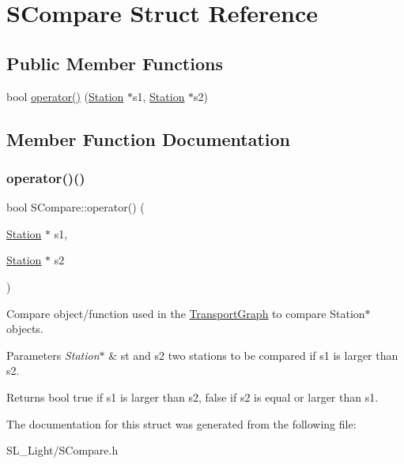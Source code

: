 \hypertarget{struct_s_compare}{}\section{S\+Compare Struct Reference}
\label{struct_s_compare}
\subsection*{Public Member Functions}
\begin{DoxyCompactItemize}
\item 
bool \mbox{\hyperlink{struct_s_compare_aea0a46a28a5c307456cc4c128a0e675a}{operator()}} (\mbox{\hyperlink{class_station}{Station}} $\ast$s1, \mbox{\hyperlink{class_station}{Station}} $\ast$s2)
\end{DoxyCompactItemize}


\subsection{Member Function Documentation}
\mbox{\label{struct_s_compare_aea0a46a28a5c307456cc4c128a0e675a}} 
\subsubsection{\texorpdfstring{operator()()}{operator()()}}
{\footnotesize\ttfamily bool S\+Compare\+::operator() (\begin{DoxyParamCaption}\item[{\mbox{\hyperlink{class_station}{Station}} $\ast$}]{s1,  }\item[{\mbox{\hyperlink{class_station}{Station}} $\ast$}]{s2 }\end{DoxyParamCaption})\hspace{0.3cm}{\ttfamily [inline]}}

Compare object/function used in the \mbox{\hyperlink{class_transport_graph}{Transport\+Graph}} to compare Station$\ast$ objects.


\begin{DoxyParams}{Parameters}
{\em Station$\ast$} & st and s2 two stations to be compared if s1 is larger than s2.\\
\hline
\end{DoxyParams}
\begin{DoxyReturn}{Returns}
bool true if s1 is larger than s2, false if s2 is equal or larger than s1. 
\end{DoxyReturn}


The documentation for this struct was generated from the following file\+:\begin{DoxyCompactItemize}
\item 
S\+L\+\_\+\+Light/S\+Compare.\+h\end{DoxyCompactItemize}
